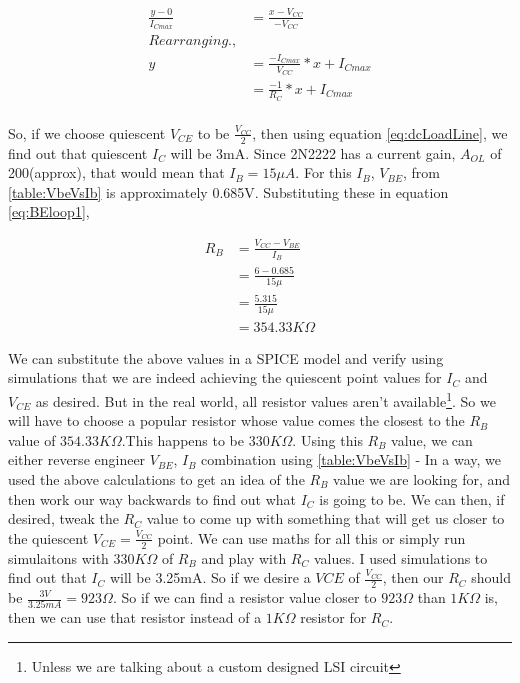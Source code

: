 	\begin{align}
	\frac{y - 0}{I_{Cmax}} &= \frac{x - V_{CC}}{-V_{CC}} \\
	Rearranging., \\
	y &= \frac{-I_{Cmax}}{V_{CC}} * x + I_{Cmax} \label{eq:dcLoadLine}\\
	   &= \frac{-1}{R_C} * x + I_{Cmax} \label{eq:dcLoadLineAlter}\\
	\end{align}

So, if we choose quiescent $V_{CE}$ to be $\frac{V_{CC}}{2}$, then using equation \autoref{eq:dcLoadLine}, we find out that quiescent $I_C$ will be 3mA. Since 2N2222 has a current gain, $A_{OL}$ of 200(approx), that would mean that $I_B = 15\mu A$.  For this $I_B$, $V_{BE}$, from \autoref{table:VbeVsIb} is approximately 0.685V. Substituting these in equation \autoref{eq:BEloop1},

	\begin{align}
	R_B &= \frac{V_{CC} - V_{BE}}{I_B} \\
	       &= \frac{6 - 0.685}{15\mu} \\
	       &= \frac{5.315}{15\mu} \\
	       &= 354.33 K\Omega
	\end{align}

We can substitute the above values in a SPICE model and verify using simulations that we are indeed achieving the quiescent point values for $I_C$ and $V_{CE}$ as desired. But in the real world, all resistor values aren't available\footnote{Unless we are talking about a custom designed LSI circuit}. So we will have to choose a popular resistor whose value comes the closest to the $R_B$ value of $354.33 K\Omega$.This happens to be $330K\Omega$. Using this $R_B$ value, we can either reverse engineer $V_{BE}$, $I_B$ combination using \autoref{table:VbeVsIb} - In a way, we used the above calculations to get an idea of the $R_B$ value we are looking for, and then work our way backwards to find out what $I_C$ is going to be. We can then, if desired, tweak the $R_C$ value to come up with something that will get us closer to the quiescent $V_{CE} = \frac{V_{CC}}{2}$ point. We can use maths for all this or simply run simulaitons with $330K\Omega$ of $R_B$ and play with $R_C$ values. I used simulations to find out that $I_C$ will be 3.25mA. So if we desire a $V{CE}$ of $\frac{V_{CC}}{2}$, then our $R_C$ should be $\frac{3V}{3.25mA} =  923\Omega$. So if we can find a resistor value closer to $923\Omega$ than $1K\Omega$ is, then we can use that resistor instead of a $1K\Omega$ resistor for $R_C$.

